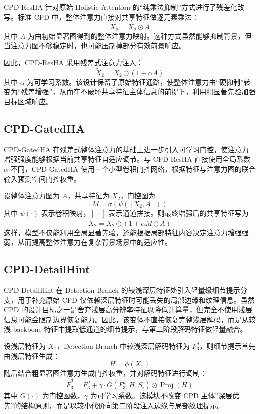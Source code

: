 \documentclass[UTF8,a4paper,10pt]{ctexart}
\begin{document}
CPD-ResHA 针对原始 Holistic Attention 的“纯乘法抑制”方式进行了残差化改写。标准 CPD 中，整体注意力直接对共享特征做逐元素乘法：
\[
\widetilde{X}_2 = X_2 \odot A
\]
其中 \(A\) 为由初始显著图得到的整体注意力映射。这种方式虽然能够抑制背景，但当注意力图不够稳定时，也可能压制掉部分有效前景响应。

因此，CPD-ResHA 采用残差式注意力注入：
\[
\widetilde{X}_2 = X_2 \odot (1 + \alpha A)
\]
其中 \(\alpha\) 为可学习系数。该设计保留了原始特征通路，使整体注意力由“硬抑制”转变为“残差增强”，从而在不破坏共享特征主体信息的前提下，利用粗显著先验加强目标区域响应。

\subsection{CPD-GatedHA}

CPD-GatedHA 在残差式整体注意力的基础上进一步引入可学习门控，使注意力增强强度能够根据当前共享特征自适应调节。与 CPD-ResHA 直接使用全局系数 \(\alpha\) 不同，CPD-GatedHA 使用一个小型卷积门控网络，根据特征与注意力图的联合输入预测空间门控权重。

设整体注意力图为 \(A\)，共享特征为 \(X_2\)，门控图为
\[
M = \sigma(\psi([X_2, A]))
\]
其中 \(\psi(\cdot)\) 表示卷积映射，\([\,\cdot\,]\) 表示通道拼接。则最终增强后的共享特征写为
\[
\widetilde{X}_2 = X_2 \odot (1 + \alpha M \odot A)
\]
这样，模型不仅能利用全局显著先验，还能根据局部特征内容决定注意力增强强弱，从而提高整体注意力在复杂背景场景中的适应性。

\subsection{CPD-DetailHint}

CPD-DetailHint 在 Detection Branch 的较浅深层特征处引入轻量级细节提示分支，用于补充原始 CPD 仅依赖深层特征时可能丢失的局部边缘和纹理信息。虽然 CPD 的设计目标之一是舍弃浅层高分辨率特征以降低计算量，但完全不使用浅层信息可能会限制边界恢复能力。因此，该变体不直接恢复完整浅层解码，而是从较浅 backbone 特征中提取低通道的细节提示，与第二阶段解码特征做轻量融合。

设浅层特征为 \(X_1\)，Detection Branch 中较浅深层解码特征为 \(F_3^d\)，则细节提示首先由浅层特征生成：
\[
H = \phi(X_1)
\]
随后结合粗显著图注意力生成门控权重，并对解码特征进行调制：
\[
\widetilde{F}_3^d = F_3^d + \gamma \cdot G(F_3^d, H, S_i)\odot \operatorname{Proj}(H)
\]
其中 \(G(\cdot)\) 为门控函数，\(\gamma\) 为可学习系数。该模块不改变 CPD 主体”深层优先”的结构原则，而是以较小代价向第二阶段注入边缘与局部纹理提示。
\end{document}

